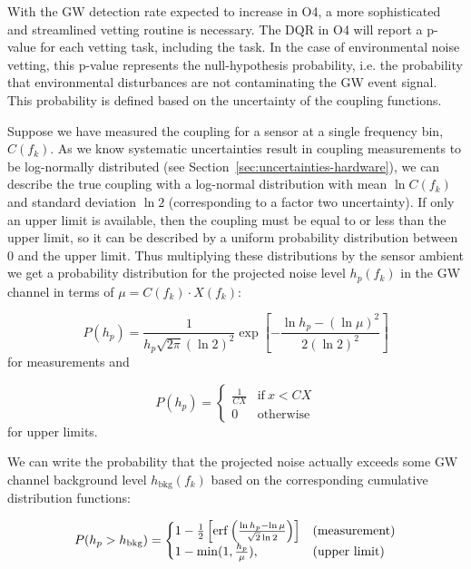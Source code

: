 With the \ac{GW} detection rate expected to increase in \ac{O4}, a more sophisticated and streamlined vetting routine is necessary.
The \ac{DQR} in \ac{O4} will report a p-value for each vetting task, including the  task.
In the case of environmental noise vetting, this p-value represents the null-hypothesis probability, i.e. the probability that environmental disturbances are not contaminating the \ac{GW} event signal.
This probability is defined based on the uncertainty of the coupling functions.

Suppose we have measured the coupling for a sensor at a single frequency bin, $C(f_k)$.
As we know systematic uncertainties result in coupling measurements to be log-normally distributed (see Section~\ref{sec:uncertainties-hardware}), we can describe the true coupling with a log-normal distribution with mean $\ln C(f_k)$ and standard deviation $\ln 2$ (corresponding to a factor two uncertainty).
If only an upper limit is available, then the coupling must be equal to or less than the upper limit, so it can be described by a uniform probability distribution between 0 and the upper limit.
Thus multiplying these distributions by the sensor ambient we get a probability distribution for the projected noise level $h_p(f_k)$ in the \ac{GW} channel in terms of $\mu = C(f_k) \cdot X(f_k)$:

\begin{equation}
	P(h_p) = \frac{1}{h_p \sqrt{2\pi} (\ln 2)^2} \exp \left[ -\frac{\ln h_p - (\ln \mu)^2}{2 (\ln 2)^2} \right]
\end{equation}
for measurements and

\begin{equation}
	P(h_p) =
		\begin{cases}
      \frac{1}{CX} & \text{if}\ x < CX\\
      0 & \text{otherwise}
    \end{cases}
\end{equation}
for upper limits.

We can write the probability that the projected noise actually exceeds some \ac{GW} channel background level $h_{\text{bkg}}(f_k)$ based on the corresponding cumulative distribution functions:

\begin{equation}
	P(h_p > h_{\text{bkg}}) =
		\begin{cases}
			1 - \frac{1}{2} \left[ \erf \left( \frac{\ln h_p - \ln \mu}{\sqrt{2} \ln 2} \right) \right] & \text{(measurement)}\\
			1 - \min(1, \frac{h_p}{\mu}), & \text{(upper limit)}
		\end{cases}
\end{equation}

